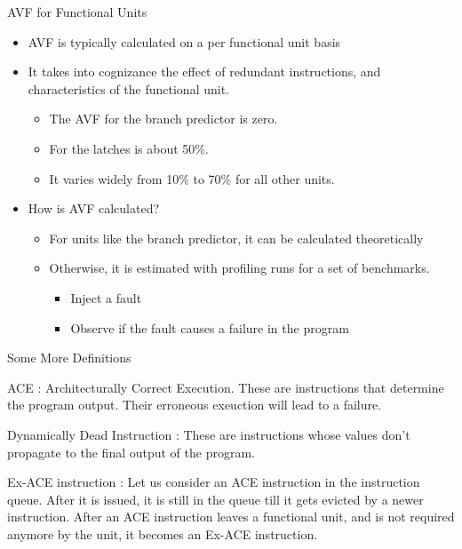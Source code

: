 \documentclass{beamer}
\begin{document}
\begin{frame}[shrink=10]{AVF for Functional Units}
  \begin{itemize}
   \item {\color{blue} AVF} is typically calculated on a per functional unit basis
   \item It takes into cognizance the effect of redundant instructions, and characteristics of the functional unit.
      \begin{itemize}
       \item The AVF for the branch predictor is zero. 
      \item For the latches is about 50\%. 
	\item It varies widely from 10\% to 70\% for all other units.
      \end{itemize}
    \item How is AVF calculated?
      \begin{itemize}
	\item For units like the branch predictor, it can be calculated theoretically
	\item Otherwise, it is estimated with profiling runs for a set of benchmarks. 
	  \begin{itemize}
	    \item Inject a fault
	    \item Observe if the fault causes a failure in the program
	  \end{itemize}
      \end{itemize}
  \end{itemize}

\end{frame}

\begin{frame}[shrink=10]{Some More Definitions}
 \begin{definition}{ACE : }
  Architecturally Correct Execution. These are instructions that determine the program output. Their erroneous exeuction will
  lead to a failure.
 \end{definition}
\pause
\begin{definition}{Dynamically Dead Instruction : }
  These are instructions whose values don't propagate to the final output of the program. 
 \end{definition}

\pause
\begin{definition}{Ex-ACE instruction : }
  Let us consider an ACE instruction in the instruction queue. After it is issued, it is still in the queue till it gets
evicted by a newer instruction. After an ACE instruction leaves a functional unit, and is not required anymore by the unit, 
 it becomes an Ex-ACE instruction. 
\end{definition}

\end{frame}
\end{document}
